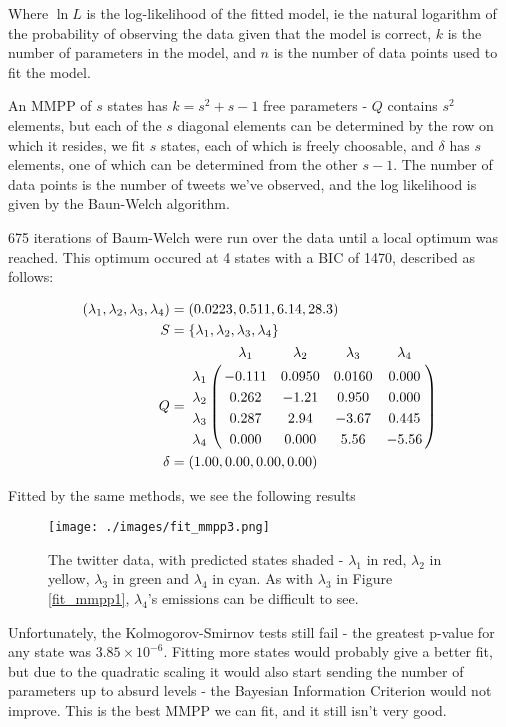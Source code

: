 Where $\ln L$ is the log-likelihood of the fitted model, ie the natural logarithm of the probability of observing the data given that the model is correct, $k$ is the number of parameters in the model, and $n$ is the number of data points used to fit the model.

An MMPP of $s$ states has $k=s^2+s-1$ free parameters - $Q$ contains $s^2$ elements, but each of the $s$ diagonal elements can be determined by the row on which it resides, we fit $s$ states, each of which is freely choosable, and $\delta$ has $s$ elements, one of which can be determined from the other $s-1$. The number of data points is the number of tweets we've observed, and the log likelihood is given by the Baun-Welch algorithm.

675 iterations of Baum-Welch were run over the data until a local optimum was reached. This optimum occured at 4 states with a BIC of 1470, described as follows:

\begin{align*}
(\lambda_1,\lambda_2,\lambda_3,\lambda_4) &= (0.0223,0.511,6.14,28.3)\\
S &= \{\lambda_1,\lambda_2,\lambda_3,\lambda_4\}\\
Q &= \bordermatrix{      & \lambda_1 & \lambda_2 & \lambda_3 & \lambda_4\cr
                \lambda_1 & -0.111 & 0.0950 & 0.0160 & 0.000 \cr
                \lambda_2 & 0.262  & -1.21  & 0.950  & 0.000 \cr
                \lambda_3 & 0.287  & 2.94   & -3.67  & 0.445 \cr
                \lambda_4 & 0.000  & 0.000  & 5.56   & -5.56 \cr
			}\\
\delta &= (1.00,0.00,0.00,0.00)
\end{align*}

Fitted by the same methods, we see the following results

\begin{figure}[h!]
\texttt{[image: ./images/fit\_mmpp3.png]}
\caption{The twitter data, with predicted states shaded - $\lambda_1$ in red, $\lambda_2$ in yellow, $\lambda_3$ in green and $\lambda_4$ in cyan. As with $\lambda_3$ in Figure \ref{fit_mmpp1}, $\lambda_4$'s emissions can be difficult to see.}
\label{fit_mmpp2}
\end{figure}

Unfortunately, the Kolmogorov-Smirnov tests still fail - the greatest p-value for any state was $3.85 \times 10^{-6}$. Fitting more states would probably give a better fit, but due to the quadratic scaling it would also start sending the number of parameters up to absurd levels - the Bayesian Information Criterion would not improve. This is the best MMPP we can fit, and it still isn't very good.


